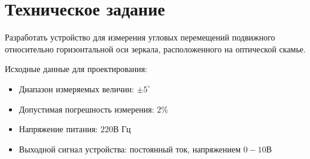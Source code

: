 \section{Техническое задание}
\label{sec:task}
Разработать устройство для измерения угловых перемещений подвижного относительно горизонтальной оси зеркала, расположенного на оптической скамье.

Исходные данные для проектирования:
\begin{itemize}
    \item Диапазон измеряемых величин: $\pm5^\circ$
    \item Допустимая погрешность измерения:	$2\%$
    \item Напряжение питания: $220\text{В}$ $\text{Гц}$
    \item Выходной сигнал устройства: постоянный ток, напряжением $0-10 \text{В}$
\end{itemize}
\newpage